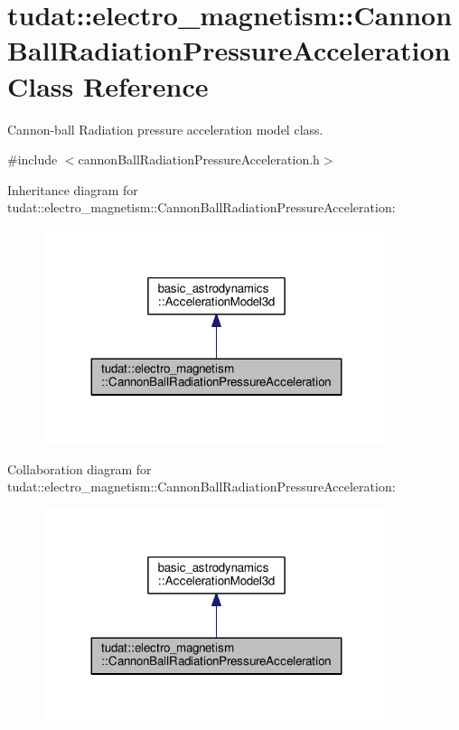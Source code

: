 \hypertarget{classtudat_1_1electro__magnetism_1_1CannonBallRadiationPressureAcceleration}{}\section{tudat\+:\+:electro\+\_\+magnetism\+:\+:Cannon\+Ball\+Radiation\+Pressure\+Acceleration Class Reference}
\label{classtudat_1_1electro__magnetism_1_1CannonBallRadiationPressureAcceleration}


Cannon-\/ball Radiation pressure acceleration model class.  




{\ttfamily \#include $<$cannon\+Ball\+Radiation\+Pressure\+Acceleration.\+h$>$}



Inheritance diagram for tudat\+:\+:electro\+\_\+magnetism\+:\+:Cannon\+Ball\+Radiation\+Pressure\+Acceleration\+:
\nopagebreak
\begin{figure}[H]
\begin{center}
\leavevmode
\includegraphics[width=287pt]{classtudat_1_1electro__magnetism_1_1CannonBallRadiationPressureAcceleration__inherit__graph}
\end{center}
\end{figure}


Collaboration diagram for tudat\+:\+:electro\+\_\+magnetism\+:\+:Cannon\+Ball\+Radiation\+Pressure\+Acceleration\+:
\nopagebreak
\begin{figure}[H]
\begin{center}
\leavevmode
\includegraphics[width=287pt]{classtudat_1_1electro__magnetism_1_1CannonBallRadiationPressureAcceleration__coll__graph}
\end{center}
\end{figure}
